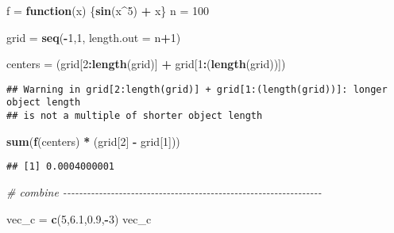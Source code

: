 \documentclass[
]{article}
\newenvironment{Shaded}{\begin{snugshade}}{\end{snugshade}}
\newcommand{\AttributeTok}[1]{\textcolor[rgb]{0.13,0.29,0.53}{#1}}
\newcommand{\CommentTok}[1]{\textcolor[rgb]{0.56,0.35,0.01}{\textit{#1}}}
\newcommand{\ControlFlowTok}[1]{\textcolor[rgb]{0.13,0.29,0.53}{\textbf{#1}}}
\newcommand{\DecValTok}[1]{\textcolor[rgb]{0.00,0.00,0.81}{#1}}
\newcommand{\FloatTok}[1]{\textcolor[rgb]{0.00,0.00,0.81}{#1}}
\newcommand{\FunctionTok}[1]{\textcolor[rgb]{0.13,0.29,0.53}{\textbf{#1}}}
\newcommand{\NormalTok}[1]{#1}
\newcommand{\OtherTok}[1]{\textcolor[rgb]{0.56,0.35,0.01}{#1}}
\newcommand{\SpecialCharTok}[1]{\textcolor[rgb]{0.81,0.36,0.00}{\textbf{#1}}}
\begin{document}
\begin{Shaded}
\begin{Highlighting}[]
\NormalTok{f }\OtherTok{=} \ControlFlowTok{function}\NormalTok{(x) \{}\FunctionTok{sin}\NormalTok{(x}\SpecialCharTok{\^{}}\DecValTok{5}\NormalTok{) }\SpecialCharTok{+}\NormalTok{ x\}}
\NormalTok{n }\OtherTok{=} \DecValTok{100}

\NormalTok{grid }\OtherTok{=} \FunctionTok{seq}\NormalTok{(}\SpecialCharTok{{-}}\DecValTok{1}\NormalTok{,}\DecValTok{1}\NormalTok{, }\AttributeTok{length.out =}\NormalTok{ n}\SpecialCharTok{+}\DecValTok{1}\NormalTok{)}

\NormalTok{centers }\OtherTok{=}\NormalTok{ (grid[}\DecValTok{2}\SpecialCharTok{:}\FunctionTok{length}\NormalTok{(grid)] }\SpecialCharTok{+}\NormalTok{ grid[}\DecValTok{1}\SpecialCharTok{:}\NormalTok{(}\FunctionTok{length}\NormalTok{(grid))])}
\end{Highlighting}
\end{Shaded}

\begin{verbatim}
## Warning in grid[2:length(grid)] + grid[1:(length(grid))]: longer object length
## is not a multiple of shorter object length
\end{verbatim}

\begin{Shaded}
\begin{Highlighting}[]
\FunctionTok{sum}\NormalTok{(}\FunctionTok{f}\NormalTok{(centers) }\SpecialCharTok{*}\NormalTok{ (grid[}\DecValTok{2}\NormalTok{] }\SpecialCharTok{{-}}\NormalTok{ grid[}\DecValTok{1}\NormalTok{]))}
\end{Highlighting}
\end{Shaded}

\begin{verbatim}
## [1] 0.0004000001
\end{verbatim}

\begin{Shaded}
\begin{Highlighting}[]
\CommentTok{\# combine {-}{-}{-}{-}{-}{-}{-}{-}{-}{-}{-}{-}{-}{-}{-}{-}{-}{-}{-}{-}{-}{-}{-}{-}{-}{-}{-}{-}{-}{-}{-}{-}{-}{-}{-}{-}{-}{-}{-}{-}{-}{-}{-}{-}{-}{-}{-}{-}{-}{-}{-}{-}{-}{-}{-}{-}{-}{-}{-}{-}{-}{-}{-}{-}{-}}

\NormalTok{vec\_c }\OtherTok{=} \FunctionTok{c}\NormalTok{(}\DecValTok{5}\NormalTok{,}\FloatTok{6.1}\NormalTok{,}\FloatTok{0.9}\NormalTok{,}\SpecialCharTok{{-}}\DecValTok{3}\NormalTok{)}
\NormalTok{vec\_c}
\end{Highlighting}
\end{Shaded}
\end{document}

